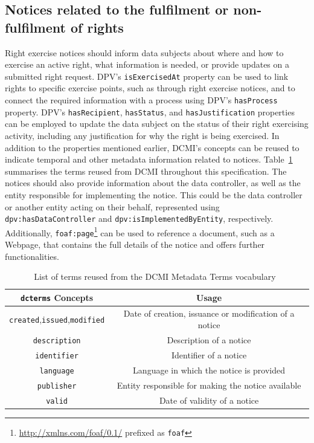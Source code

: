\documentclass{IOS-Book-Article}     %
\begin{document}
\subsection{Notices related to the fulfilment or non-fulfilment of rights}
\label{sec:notices}

Right exercise notices should inform data subjects about where and how to exercise an active right, what information is needed, or provide updates on a submitted right request.
DPV’s \texttt{isExercisedAt} property can be used to link rights to specific exercise points, such as through right exercise notices, and to connect the required information with a process using DPV’s \texttt{hasProcess} property. DPV's \texttt{hasRecipient}, \texttt{hasStatus}, and \texttt{hasJustification} properties can be employed to update the data subject on the status of their right exercising activity, including any justification for why the right is being exercised.
In addition to the properties mentioned earlier, DCMI's concepts can be reused to indicate temporal and other metadata information related to notices.
Table~\ref{tab:dcterms} summarises the terms reused from DCMI throughout this specification.
The notices should also provide information about the data controller, as well as the entity responsible for implementing the notice.
This could be the data controller or another entity acting on their behalf, represented using \texttt{dpv:hasDataController} and \texttt{dpv:isImplementedByEntity}, respectively. Additionally, \texttt{foaf:page}\footnote{\url{http://xmlns.com/foaf/0.1/} prefixed as \texttt{foaf}} can be used to reference a document, such as a Webpage, that contains the full details of the notice and offers further functionalities.

\begin{table}[ht]
    \centering\fontsize{7}{8}
    \begin{tabular}{|c|c|}
        \hline
        \textbf{\texttt{dcterms} Concepts} & \textbf{Usage} \\ \hline\hline
        \texttt{created},\texttt{issued},\texttt{modified} & Date of creation, issuance or modification of a notice \\ \hline
        \texttt{description} & Description of a notice \\ \hline
        \texttt{identifier} & Identifier of a notice \\ \hline
        \texttt{language} & Language in which the notice is provided \\ \hline
        \texttt{publisher} & Entity responsible for making the notice available \\ \hline
        \texttt{valid} & Date of validity of a notice \\ \hline
    \end{tabular}
    \caption{List of terms reused from the DCMI Metadata Terms vocabulary~\cite{dcmi_2020}}
    \label{tab:dcterms}
\end{table}
\end{document}

